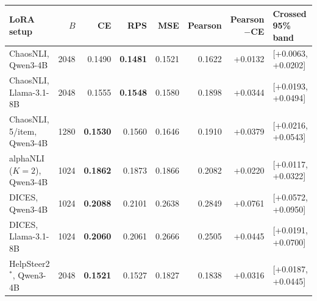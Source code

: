 \begin{tabular}{lrrrrrrl}
\toprule
LoRA setup & $B$ & CE & RPS & MSE & Pearson & Pearson$-$CE & Crossed 95\% band \\
\midrule
ChaosNLI, Qwen3-4B & 2048 & 0.1490 & \textbf{0.1481} & 0.1521 & 0.1622 & +0.0132 & [+0.0063, +0.0202] \\
ChaosNLI, Llama-3.1-8B & 2048 & 0.1555 & \textbf{0.1548} & 0.1580 & 0.1898 & +0.0344 & [+0.0193, +0.0494] \\
ChaosNLI, 5/item, Qwen3-4B & 1280 & \textbf{0.1530} & 0.1560 & 0.1646 & 0.1910 & +0.0379 & [+0.0216, +0.0543] \\
alphaNLI ($K{=}2$), Qwen3-4B & 1024 & \textbf{0.1862} & 0.1873 & 0.1866 & 0.2082 & +0.0220 & [+0.0117, +0.0322] \\
DICES, Qwen3-4B & 1024 & \textbf{0.2088} & 0.2101 & 0.2638 & 0.2849 & +0.0761 & [+0.0572, +0.0950] \\
DICES, Llama-3.1-8B & 1024 & \textbf{0.2060} & 0.2061 & 0.2666 & 0.2505 & +0.0445 & [+0.0191, +0.0700] \\
HelpSteer2$^{\ast}$, Qwen3-4B & 2048 & \textbf{0.1521} & 0.1527 & 0.1827 & 0.1838 & +0.0316 & [+0.0187, +0.0445] \\
\bottomrule
\end{tabular}
